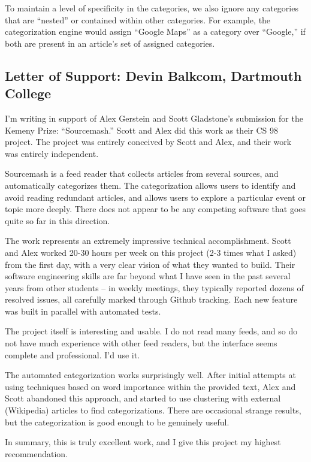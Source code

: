 \documentclass[11pt]{article}
\begin{document}
To maintain a level of specificity in the categories, we also ignore any categories that are ``nested'' or contained within other categories. For example, the categorization engine would assign ``Google Maps'' as a category over ``Google,'' if both are present in an article's set of assigned categories.

\subsection{Letter of Support: Devin Balkcom, Dartmouth College}

I'm writing in support of Alex Gerstein and Scott Gladstone's submission for the Kemeny Prize: ``Sourcemash.''  Scott and Alex did this work as their CS 98 project. The project was entirely conceived by Scott and Alex, and their work was entirely independent.

Sourcemash is a feed reader that collects articles from several sources, and automatically categorizes them.  The categorization allows users to identify and avoid reading redundant articles, and allows users to explore a particular event or topic more deeply. There does not appear to be any competing software that goes quite so far in this direction. 

The work represents an extremely impressive technical accomplishment. Scott and Alex worked 20-30 hours per week on this project (2-3 times what I asked) from the first day, with a very clear vision of what they wanted to build. Their software engineering skills are far beyond what I have seen in the past several years from other students -- in weekly meetings, they typically reported dozens of resolved issues, all carefully marked through Github tracking. Each new feature was built in parallel with automated tests. 

The project itself is interesting and usable. I do not read many feeds, and so do not have much experience with other feed readers, but the interface seems complete and professional. I'd use it. 

The automated categorization works surprisingly well. After initial attempts at using techniques based on word importance within the provided text, Alex and Scott abandoned this approach, and started to use clustering with external (Wikipedia) articles to find categorizations. There are occasional strange results, but the categorization is good enough to be genuinely useful.

In summary, this is truly excellent work, and I give this project my highest recommendation.
\end{document}
